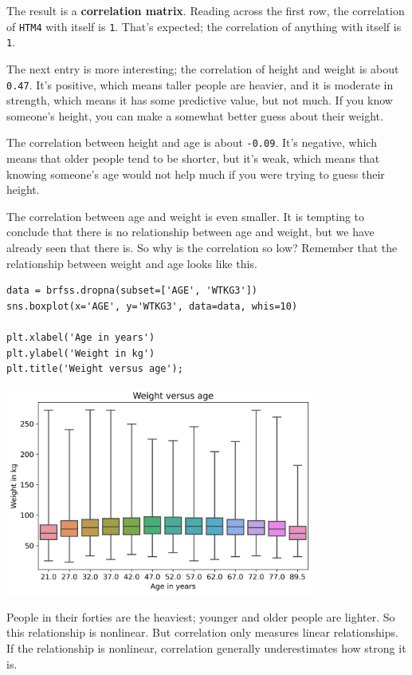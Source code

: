 The result is a \textbf{correlation matrix}. Reading across the first
row, the correlation of \passthrough{\lstinline!HTM4!} with itself is
\passthrough{\lstinline!1!}. That's expected; the correlation of
anything with itself is \passthrough{\lstinline!1!}.

The next entry is more interesting; the correlation of height and weight
is about \passthrough{\lstinline!0.47!}. It's positive, which means
taller people are heavier, and it is moderate in strength, which means
it has some predictive value, but not much. If you know someone's
height, you can make a somewhat better guess about their weight.

The correlation between height and age is about
\passthrough{\lstinline!-0.09!}. It's negative, which means that older
people tend to be shorter, but it's weak, which means that knowing
someone's age would not help much if you were trying to guess their
height.

The correlation between age and weight is even smaller. It is tempting
to conclude that there is no relationship between age and weight, but we
have already seen that there is. So why is the correlation so low?
Remember that the relationship between weight and age looks like this.

\begin{lstlisting}[]
data = brfss.dropna(subset=['AGE', 'WTKG3'])
sns.boxplot(x='AGE', y='WTKG3', data=data, whis=10)

plt.xlabel('Age in years')
plt.ylabel('Weight in kg')
plt.title('Weight versus age');
\end{lstlisting}

\begin{center}
\includegraphics[width=4in]{chapters/09_relationships_files/09_relationships_57_0.png}
\end{center}

People in their forties are the heaviest; younger and older people are
lighter. So this relationship is nonlinear. But correlation only
measures linear relationships. If the relationship is nonlinear,
correlation generally underestimates how strong it is.

